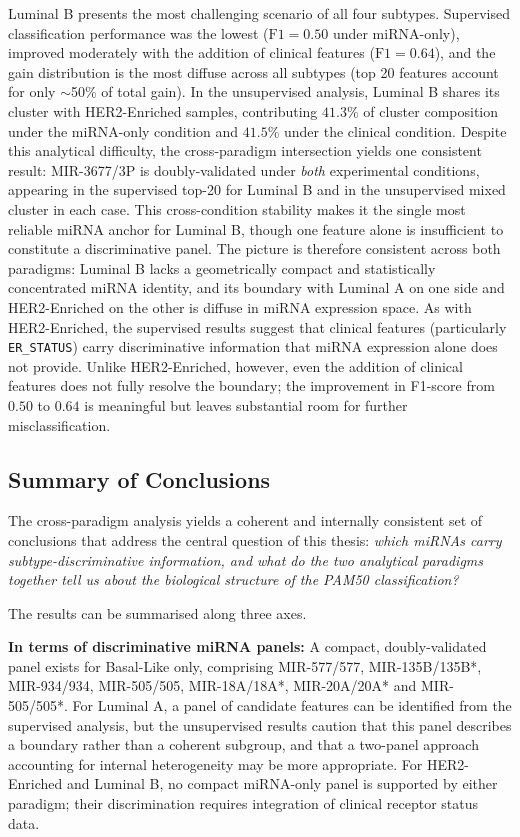 Luminal B presents the most challenging scenario of all four subtypes. Supervised
classification performance was the lowest ($\text{F1} = 0.50$ under miRNA-only),
improved moderately with the addition of clinical features ($\text{F1} = 0.64$), and
the gain distribution is the most diffuse across all subtypes (top 20 features account
for only $\sim$50\% of total gain). In the unsupervised analysis, Luminal B shares its
cluster with HER2-Enriched samples, contributing $41.3\%$ of cluster composition under
the miRNA-only condition and $41.5\%$ under the clinical condition. Despite this
analytical difficulty, the cross-paradigm intersection yields one consistent result:
MIR-3677/3P is doubly-validated under \textit{both} experimental conditions, appearing
in the supervised top-20 for Luminal B and in the unsupervised mixed cluster in each
case. This cross-condition stability makes it the single most reliable miRNA anchor for
Luminal B, though one feature alone is insufficient to constitute a discriminative
panel. The picture is therefore consistent across both paradigms: Luminal B lacks a
geometrically compact and statistically concentrated miRNA identity, and its boundary
with Luminal A on one side and HER2-Enriched on the other is diffuse in miRNA
expression space. As with HER2-Enriched, the supervised results suggest that clinical
features (particularly \texttt{ER\_STATUS}) carry discriminative information that
miRNA expression alone does not provide. Unlike HER2-Enriched, however, even the
addition of clinical features does not fully resolve the boundary; the improvement in
F1-score from $0.50$ to $0.64$ is meaningful but leaves substantial room for further
misclassification.
\subsection{Summary of Conclusions}
\label{sec:unsupervised:summary}

The cross-paradigm analysis yields a coherent and internally consistent set of
conclusions that address the central question of this thesis: \textit{which miRNAs
carry subtype-discriminative information, and what do the two analytical paradigms
together tell us about the biological structure of the PAM50 classification?}

The results can be summarised along three axes.

\textbf{In terms of discriminative miRNA panels:} A compact, doubly-validated panel
exists for Basal-Like only, comprising MIR-577/577, MIR-135B/135B*, MIR-934/934, 
MIR-505/505, MIR-18A/18A*, MIR-20A/20A* and MIR-505/505*. For Luminal A, a panel of candidate features can be
identified from the supervised analysis, but the unsupervised results caution that this
panel describes a boundary rather than a coherent subgroup, and that a two-panel
approach accounting for internal heterogeneity may be more appropriate. For HER2-Enriched
and Luminal B, no compact miRNA-only panel is supported by either paradigm; their
discrimination requires integration of clinical receptor status data.

